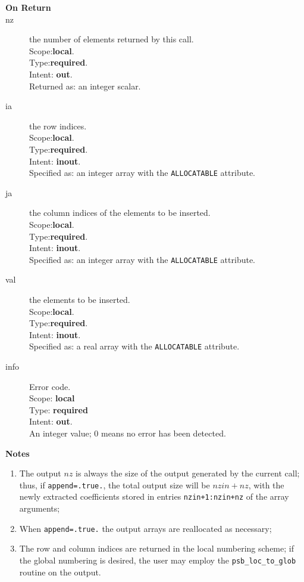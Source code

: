 \begin{description}
\item[\bf On Return]
\item[nz] the number of elements returned by this call.\\
Scope:{\bf local}.\\
Type:{\bf required}.\\
Intent: {\bf out}.\\
Returned  as: an integer scalar.
\item[ia] the row indices.\\
Scope:{\bf local}.\\
Type:{\bf required}.\\
Intent: {\bf inout}.\\
Specified as: an integer array with the \verb|ALLOCATABLE| attribute.
\item[ja] the column indices of the elements to be inserted.\\
Scope:{\bf local}.\\
Type:{\bf required}.\\
Intent: {\bf inout}.\\
Specified as: an integer array with the \verb|ALLOCATABLE| attribute.
\item[val] the elements to be inserted.\\
Scope:{\bf local}.\\
Type:{\bf required}.\\
Intent: {\bf inout}.\\
Specified as: a real  array with the \verb|ALLOCATABLE| attribute.
\item[info] Error code.\\
Scope: {\bf local} \\
Type: {\bf required} \\
Intent: {\bf out}.\\
An integer value; 0 means no error has been detected. 
\end{description}

{\par\noindent\large\bfseries Notes}
\begin{enumerate}
\item The output $nz$ is always the size of the output generated by
  the current call; thus, if \verb|append=.true.|, the total output
  size will be $nzin+nz$, with the newly extracted coefficients stored in
  entries \verb|nzin+1:nzin+nz| of the array arguments;
\item When \verb|append=.true.|  the output arrays are reallocated as
  necessary;
\item The row and column indices are returned in the local numbering
  scheme; if the global numbering is desired, the user may employ the
  \verb|psb_loc_to_glob| routine on the output.
\end{enumerate}




